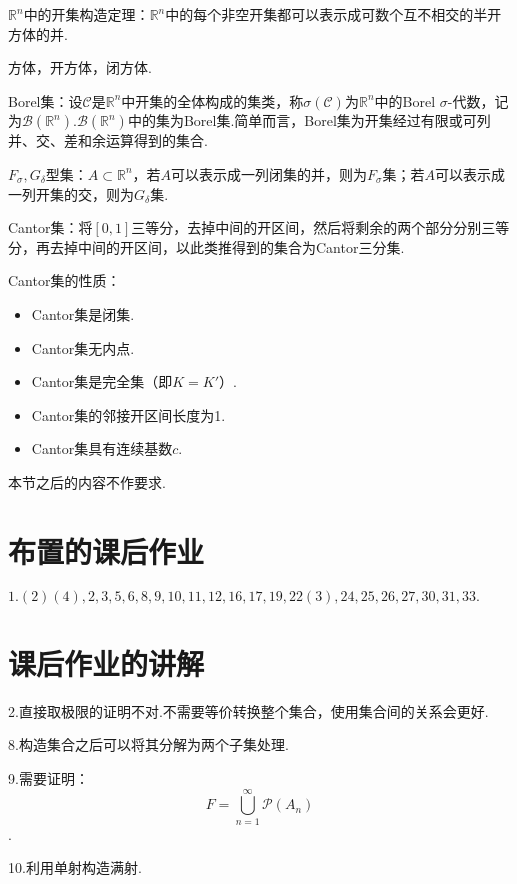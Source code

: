 \documentclass[bwprint, withoutpreface]{cumcmthesis}
\begin{document}
$\mathbb{R}^n$中的开集构造定理：$\mathbb{R}^n$中的每个非空开集都可以表示成可数个互不相交的半开方体的并.

方体，开方体，闭方体.

Borel集：设$\mathcal{C}$是$\mathbb{R}^n$中开集的全体构成的集类，称$\sigma(\mathcal{C})$为$\mathbb{R}^n$中的Borel $\sigma$-代数，记为$\mathcal{B}(\mathbb{R}^n)$.$\mathcal{B}(\mathbb{R}^n)$中的集为Borel集.简单而言，Borel集为开集经过有限或可列并、交、差和余运算得到的集合.

$F_{\sigma},G_{\delta}$型集：$A \subset \mathbb{R}^n$，若$A$可以表示成一列闭集的并，则为$F_{\sigma}$集；若$A$可以表示成一列开集的交，则为$G_{\delta}$集.

Cantor集：将$[0, 1]$三等分，去掉中间的开区间，然后将剩余的两个部分分别三等分，再去掉中间的开区间，以此类推得到的集合为Cantor三分集.

Cantor集的性质：
\begin{itemize}[itemindent=2em]
	\item Cantor集是闭集.
	\item Cantor集无内点.
	\item Cantor集是完全集（即$K=K'$）.
	\item Cantor集的邻接开区间长度为1.
	\item Cantor集具有连续基数$c$.
\end{itemize}

本节之后的内容不作要求.

\newpage

\appendix
\section{布置的课后作业}
\indent $1.(2)(4),2,3,5,6,8,9,10,11,12,16,17,19,22(3),24,25,26,27,30,31,33.$

\section{课后作业的讲解}
\indent 2.直接取极限的证明不对.不需要等价转换整个集合，使用集合间的关系会更好.

8.构造集合之后可以将其分解为两个子集处理.

9.需要证明：
\begin{equation*}
	F = \bigcup_{n = 1}^{\infty}{\mathcal{P}(A_n)}
\end{equation*}.

10.利用单射构造满射.
\end{document}
